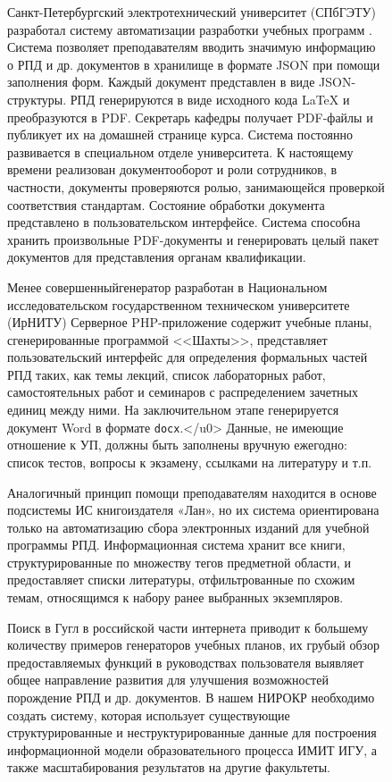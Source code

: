 \documentclass[ 

]{aiitart}
\begin{document}
\begin{figure}
Санкт-Петербургский электротехнический университет (СПбГЭТУ) разработал систему автоматизации разработки учебных программ \cite{leti}. Система позволяет преподавателям вводить значимую информацию о РПД и др. документов в хранилище в формате JSON при помощи заполнения форм. Каждый документ представлен в виде JSON-структуры. РПД генерируются в виде исходного кода \LaTeX{} и преобразуются в PDF. Секретарь кафедры получает PDF-файлы и публикует их на домашней странице курса. Система постоянно развивается в специальном отделе университета. К настоящему времени реализован документооборот и роли сотрудников, в частности, документы проверяются ролью, занимающейся проверкой соответствия стандартам. Состояние обработки документа представлено в пользовательском интерфейсе. Система способна хранить произвольные PDF-документы и генерировать целый пакет документов для представления органам квалификации. 

Менее совершенныйгенератор разработан в Национальном исследовательском государственном техническом университете (ИрНИТУ) \cite{nrtu} Серверное PHP-приложение содержит учебные планы, сгенерированные программой <<Шахты>>, представляет пользовательский интерфейс для определения формальных частей РПД таких, как темы лекций, список лабораторных работ, самостоятельных работ и семинаров с распределением зачетных единиц между ними. На заключительном этапе генерируется документ Word в формате \verb|docx|.</u0> Данные, не имеющие отношение к УП, должны быть заполнены вручную ежегодно: список тестов, вопросы к экзамену, ссылками на литературу и т.п. 

Аналогичный принцип помощи преподавателям находится в основе подсистемы ИС книгоиздателя «Лан», но их система ориентирована только на автоматизацию сбора электронных изданий для учебной программы РПД. Информационная система хранит все книги, структурированные по множеству тегов предметной области, и предоставляет списки литературы, отфильтрованные по схожим темам, относящимся к набору ранее выбранных экземпляров. 

Поиск в Гугл в российской части интернета приводит к большему количеству примеров генераторов учебных планов, их грубый обзор предоставляемых функций в руководствах пользователя выявляет общее направление развития для улучшения возможностей порождение РПД и др. документов. В нашем НИРОКР необходимо создать систему, которая использует существующие структурированные и неструктурированные данные для построения информационной модели образовательного процесса ИМИТ ИГУ, а также масштабирования результатов на другие факультеты. 


\end{figure}
\end{document}

